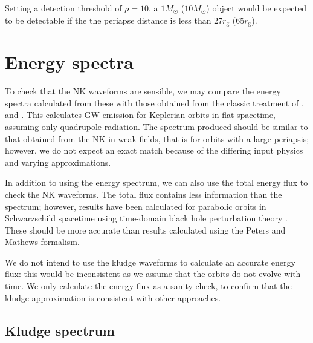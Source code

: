 \documentclass[useAMS,usedcolumn,usegraphicx,usenatbib]{mn2e}
\newcommand{\sub}[1]{\ensuremath{_\mathrm{#1}}}
\begin{document}
Setting a detection threshold of $\rho = 10$, a $1 M_\odot$ ($10 M_\odot$) object would be expected to be detectable if the the periapse distance is less than $27 r\sub{g}$ ($65 r\sub{g}$).

\section{Energy spectra}\label{sec:Energy}

To check that the NK waveforms are sensible, we may compare the energy spectra calculated from these with those obtained from the classic treatment of \citet{Peters1963}, and \citet{Peters1964}. This calculates GW emission for Keplerian orbits in flat spacetime, assuming only quadrupole radiation. The spectrum produced should be similar to that obtained from the NK in weak fields, that is for orbits with a large periapsis; however, we do not expect an exact match because of the differing input physics and varying approximations.

In addition to using the energy spectrum, we can also use the total energy flux to check the NK waveforms. The total flux contains less information than the spectrum; however, results have been calculated for parabolic orbits in Schwarzschild spacetime using time-domain black hole perturbation theory \citep{Martel2004}. These should be more accurate than results calculated using the Peters and Mathews formalism.

We do not intend to use the kludge waveforms to calculate an accurate energy flux: this would be inconsistent as we assume that the orbits do not evolve with time. We only calculate the energy flux as a sanity check, to confirm that the kludge approximation is consistent with other approaches.

\subsection{Kludge spectrum}
\end{document}
